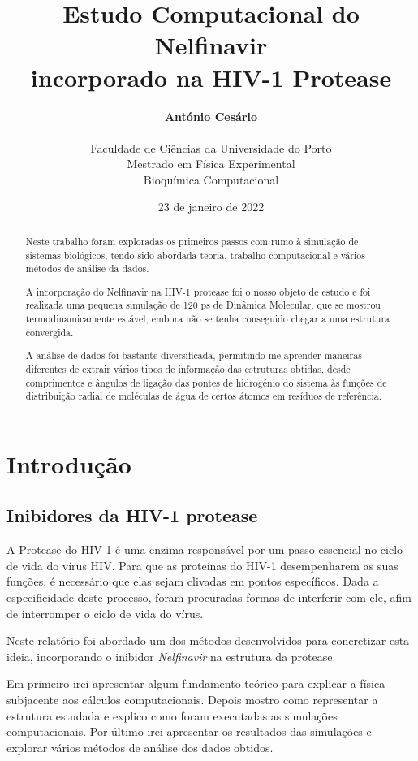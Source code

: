 \documentclass[12pt,a4paper]{article}
\title{\textbf{Estudo Computacional do Nelfinavir\\incorporado na HIV-1 Protease}}
\author{\textbf{António Cesário}\\\\%
	Faculdade de Ciências da Universidade do Porto\\%
	Mestrado em Física Experimental\\%
	Bioquímica Computacional%
	}
\date{23 de janeiro de 2022}
\begin{document}
	\maketitle
	\begin{abstract}
		Neste trabalho foram exploradas os primeiros passos com rumo à simulação de sistemas biológicos, tendo sido abordada teoria, trabalho computacional e vários métodos de análise da dados.
	
		A incorporação do Nelfinavir na HIV-1 protease foi o nosso objeto de estudo e foi realizada uma pequena simulação de 120 ps de Dinâmica Molecular, que se mostrou termodinamicamente estável, embora não se tenha conseguido chegar a uma estrutura convergida.
		
		A análise de dados foi bastante diversificada, permitindo-me aprender maneiras diferentes de extrair vários tipos de informação das estruturas obtidas, desde comprimentos e ângulos de ligação das pontes de hidrogénio do sistema às funções de distribuição radial de moléculas de água de certos átomos em resíduos de referência.
	\end{abstract}
	\newpage
	
\section{Introdução}
\subsection{Inibidores da HIV-1 protease}
	A Protease do HIV-1 é uma enzima responsável por um passo essencial no ciclo de vida do vírus HIV. Para que as proteínas do HIV-1 desempenharem as suas funções, é necessário que elas sejam clivadas em pontos específicos. Dada a especificidade deste processo, foram procuradas formas de interferir com ele, afim de interromper o ciclo de vida do vírus.
	
	Neste relatório foi abordado um dos métodos desenvolvidos para concretizar esta ideia, incorporando o inibidor \textit{Nelfinavir} na estrutura da protease.
	
	Em primeiro irei apresentar algum fundamento teórico para explicar a física subjacente aos cálculos computacionais. Depois mostro como representar a estrutura estudada e explico como foram executadas as simulações computacionais. Por último irei apresentar os resultados das simulações e explorar vários métodos de análise dos dados obtidos.
	
\end{document}
